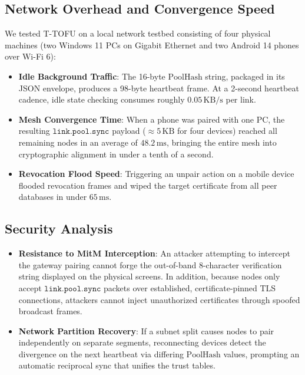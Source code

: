 \documentclass[conference]{IEEEtran}
\begin{document}
\subsection{Network Overhead and Convergence Speed}
We tested T-TOFU on a local network testbed consisting of four physical machines (two Windows 11 PCs on Gigabit Ethernet and two Android 14 phones over Wi-Fi 6):
\begin{itemize}
    \item \textbf{Idle Background Traffic}: The 16-byte $\text{PoolHash}$ string, packaged in its JSON envelope, produces a 98-byte heartbeat frame. At a 2-second heartbeat cadence, idle state checking consumes roughly $0.05\,\text{KB/s}$ per link.
    \item \textbf{Mesh Convergence Time}: When a phone was paired with one PC, the resulting $\texttt{link.pool.sync}$ payload ($\approx 5\,\text{KB}$ for four devices) reached all remaining nodes in an average of $48.2\,\text{ms}$, bringing the entire mesh into cryptographic alignment in under a tenth of a second.
    \item \textbf{Revocation Flood Speed}: Triggering an unpair action on a mobile device flooded revocation frames and wiped the target certificate from all peer databases in under $65\,\text{ms}$.
\end{itemize}

\subsection{Security Analysis}
\begin{itemize}
    \item \textbf{Resistance to MitM Interception}: An attacker attempting to intercept the gateway pairing cannot forge the out-of-band 8-character verification string displayed on the physical screens. In addition, because nodes only accept $\texttt{link.pool.sync}$ packets over established, certificate-pinned TLS connections, attackers cannot inject unauthorized certificates through spoofed broadcast frames.
    \item \textbf{Network Partition Recovery}: If a subnet split causes nodes to pair independently on separate segments, reconnecting devices detect the divergence on the next heartbeat via differing $\text{PoolHash}$ values, prompting an automatic reciprocal sync that unifies the trust tables.
\end{itemize}
\end{document}
